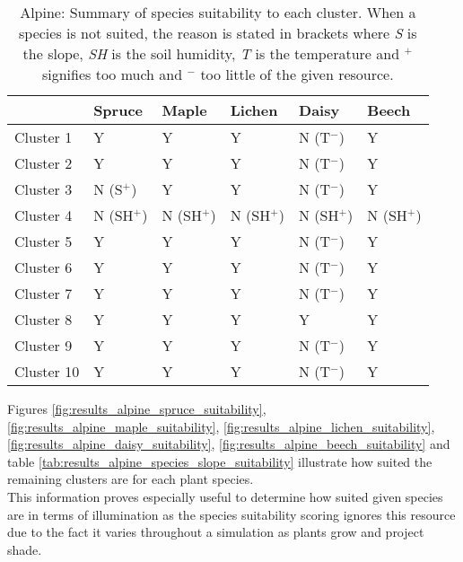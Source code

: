 
\begin{table}[h]
  \centering
	    \begin{tabular}{|p{2cm}|p{2.5cm}|p{2.5cm}|p{2.5cm}|p{2.5cm}|p{2.5cm}|}
		\hline	
		&  \textbf{Spruce} & \textbf{Maple} & \textbf{Lichen} & \textbf{Daisy} & \textbf{Beech}\\
		\hline	
		Cluster 1 & 
		Y & 
		Y & 
		Y & 
		\cellcolor{color_red}N (T$^{-}$) & 
		Y \\
		\hline	
		Cluster 2 & 
		Y & 
		Y & 
		Y & 
		\cellcolor{color_red}N (T$^{-}$) & 
		Y \\
		\hline	
		Cluster 3 & 
		\cellcolor{color_red}N (S$^{+}$) & 
		Y & 
		Y & 
		\cellcolor{color_red}N (T$^{-}$) & 
		Y \\
		\hline	
		Cluster 4 & 
		\cellcolor{color_red}N (SH$^{+}$) & 
		\cellcolor{color_red}N (SH$^{+}$) & 
		\cellcolor{color_red}N (SH$^{+}$) & 
		\cellcolor{color_red}N (SH$^{+}$) & 
		\cellcolor{color_red}N (SH$^{+}$) \\
		\hline	
		Cluster 5 & 
		Y & 
		Y & 
		Y & 
		\cellcolor{color_red}N (T$^{-}$) & 
		Y \\
		\hline	
		Cluster 6 & 
		Y & 
		Y & 
		Y & 
		\cellcolor{color_red}N (T$^{-}$) & 
		Y \\
		\hline	
		Cluster 7 & 
		Y & 
		Y & 
		Y & 
		\cellcolor{color_red}N (T$^{-}$) & 
		Y \\
		\hline	
		Cluster 8 & 
		Y & 
		Y & 
		Y & 
		Y &
		Y \\
		\hline	
		Cluster 9 & 
		Y & 
		Y & 
		Y & 
		\cellcolor{color_red}N (T$^{-}$) & 
		Y \\
		\hline	
		Cluster 10 &
		Y & 
		Y & 
		Y & 
		\cellcolor{color_red}N (T$^{-}$) & 
		Y \\
		\hline	
		\end{tabular}
		\caption{Alpine: Summary of species suitability to each cluster. When a species is not suited, the reason is stated in brackets where \textit{S} is the slope, \textit{SH} is the soil humidity, \textit{T} is the temperature and $^{+}$ signifies too much and $^{-}$ too little of the given resource.}
	  \label{tab:results_alpine_species_suitability}
\end{table}

Figures \ref{fig:results_alpine_spruce_suitability}, \ref{fig:results_alpine_maple_suitability}, \ref{fig:results_alpine_lichen_suitability}, \ref{fig:results_alpine_daisy_suitability}, \ref{fig:results_alpine_beech_suitability} and table \ref{tab:results_alpine_species_slope_suitability} illustrate how suited the remaining clusters are for each plant species.\\
This information proves especially useful to determine how suited given species are in terms of illumination as the species suitability scoring ignores this resource due to the fact it varies throughout a simulation as plants grow and project shade.\\

